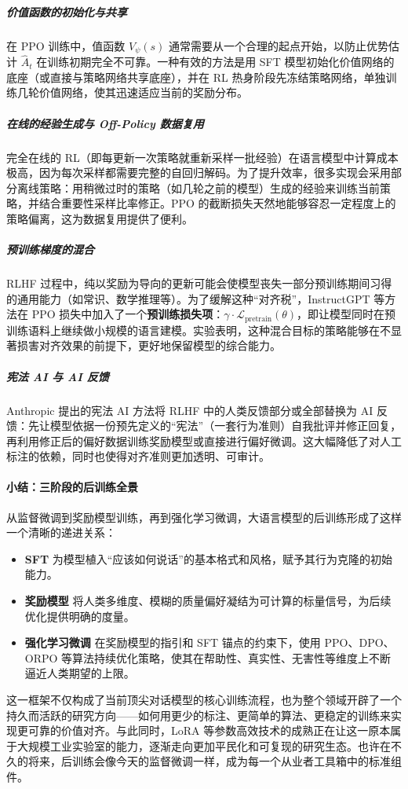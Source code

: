 \subparagraph{价值函数的初始化与共享} 在 PPO 训练中，值函数 $V_\psi(s)$ 通常需要从一个合理的起点开始，以防止优势估计 $\hat{A}_t$ 在训练初期完全不可靠。一种有效的方法是用 SFT 模型初始化价值网络的底座（或直接与策略网络共享底座），并在 RL 热身阶段先冻结策略网络，单独训练几轮价值网络，使其迅速适应当前的奖励分布。

\subparagraph{在线的经验生成与 Off-Policy 数据复用} 完全在线的 RL（即每更新一次策略就重新采样一批经验）在语言模型中计算成本极高，因为每次采样都需要完整的自回归解码。为了提升效率，很多实现会采用部分离线策略：用稍微过时的策略（如几轮之前的模型）生成的经验来训练当前策略，并结合重要性采样比率修正。PPO 的截断损失天然地能够容忍一定程度上的策略偏离，这为数据复用提供了便利。

\subparagraph{预训练梯度的混合} RLHF 过程中，纯以奖励为导向的更新可能会使模型丧失一部分预训练期间习得的通用能力（如常识、数学推理等）。为了缓解这种“对齐税”，InstructGPT 等方法在 PPO 损失中加入了一个\textbf{预训练损失项}：$\gamma \cdot \mathcal{L}_{\text{pretrain}}(\theta)$，即让模型同时在预训练语料上继续做小规模的语言建模。实验表明，这种混合目标的策略能够在不显著损害对齐效果的前提下，更好地保留模型的综合能力\cite{ouyang2022traininglanguagemodelsfollow}。

\subparagraph{宪法 AI 与 AI 反馈} Anthropic 提出的宪法 AI 方法将 RLHF 中的人类反馈部分或全部替换为 AI 反馈：先让模型依据一份预先定义的“宪法”（一套行为准则）自我批评并修正回复，再利用修正后的偏好数据训练奖励模型或直接进行偏好微调\cite{bai2022constitutionalai}。这大幅降低了对人工标注的依赖，同时也使得对齐准则更加透明、可审计。

\paragraph{小结：三阶段的后训练全景}

从监督微调到奖励模型训练，再到强化学习微调，大语言模型的后训练形成了这样一个清晰的递进关系：
\begin{itemize}
    \item \textbf{SFT} 为模型植入“应该如何说话”的基本格式和风格，赋予其行为克隆的初始能力。
    \item \textbf{奖励模型} 将人类多维度、模糊的质量偏好凝结为可计算的标量信号，为后续优化提供明确的度量。
    \item \textbf{强化学习微调} 在奖励模型的指引和 SFT 锚点的约束下，使用 PPO、DPO、ORPO 等算法持续优化策略，使其在帮助性、真实性、无害性等维度上不断逼近人类期望的上限。
\end{itemize}
这一框架不仅构成了当前顶尖对话模型的核心训练流程，也为整个领域开辟了一个持久而活跃的研究方向——如何用更少的标注、更简单的算法、更稳定的训练来实现更可靠的价值对齐。与此同时，LoRA 等参数高效技术的成熟正在让这一原本属于大规模工业实验室的能力，逐渐走向更加平民化和可复现的研究生态。也许在不久的将来，后训练会像今天的监督微调一样，成为每一个从业者工具箱中的标准组件。